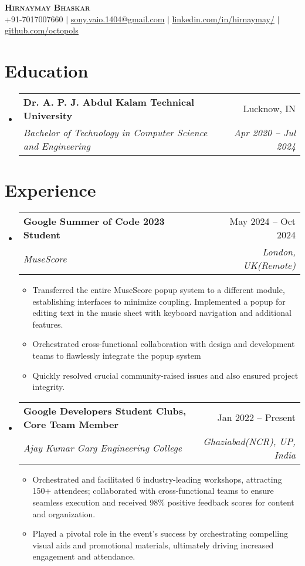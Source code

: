 \documentclass[letterpaper,11pt]{article}
\makeatletter
\newcommand{\resumeItem}[1]{
  \item\small{
    {#1 \vspace{-2pt}}
  }
}
\newcommand{\resumeSubheading}[4]{
  \vspace{-2pt}\item
    \begin{tabular*}{0.97\textwidth}[t]{l@{\extracolsep{\fill}}r}
      \textbf{#1} & #2 \\
      \textit{\small#3} & \textit{\small #4} \\
    \end{tabular*}\vspace{-7pt}
}
\newcommand{\resumeSubHeadingListStart}{\begin{itemize}[leftmargin=0.15in, label={}]}
\newcommand{\resumeSubHeadingListEnd}{\end{itemize}}
\newcommand{\resumeItemListStart}{\begin{itemize}}
\newcommand{\resumeItemListEnd}{\end{itemize}\vspace{-5pt}}
\makeatother
\begin{document}
\begin{center}
    \textbf{\Huge \scshape Hirnaymay Bhaskar} \\ \vspace{1pt}
    \small +91-7017007660 $|$ \href{mailto:sony.vaio.1404@gmail.com}{\underline{sony.vaio.1404@gmail.com}} $|$ 
    \href{https://linkedin.com/in/hirnaymay}{\underline{linkedin.com/in/hirnaymay/}} $|$
    \href{https://github.com/octopols}{\underline{github.com/octopols}}
\end{center}


\section{Education}
  \resumeSubHeadingListStart
    \resumeSubheading
      {Dr. A. P. J. Abdul Kalam Technical University}{Lucknow, IN}
      {Bachelor of Technology in Computer Science and Engineering}{Apr 2020 -- Jul 2024}
  \resumeSubHeadingListEnd


\section{Experience}
  \resumeSubHeadingListStart

    \resumeSubheading
      {Google Summer of Code 2023 Student}{May 2024 -- Oct 2024}
      {MuseScore}{London, UK(Remote)}
      \resumeItemListStart
        \resumeItem{Transferred the entire MuseScore popup system to a different module, establishing interfaces to minimize coupling. Implemented a popup for editing text in the music sheet with keyboard navigation and additional features.}
        \resumeItem{Orchestrated cross-functional collaboration with design and development teams to flawlessly integrate the popup system}
        \resumeItem{Quickly resolved crucial community-raised issues and also ensured project integrity.}
      \resumeItemListEnd
      
    \resumeSubheading
      {Google Developers Student Clubs, Core Team Member}{Jan 2022 -- Present}
      {Ajay Kumar Garg Engineering College}{Ghaziabad(NCR), UP, India}
      \resumeItemListStart
        \resumeItem{ Orchestrated and facilitated 6 industry-leading workshops, attracting 150+ attendees; collaborated with cross-functional teams to ensure seamless execution and received 98\% positive feedback scores for content and organization.}
        \resumeItem{Played a pivotal role in the event's success by orchestrating compelling visual aids and promotional materials, ultimately driving increased engagement and attendance.}
    \resumeItemListEnd
  \resumeSubHeadingListEnd
\end{document}
